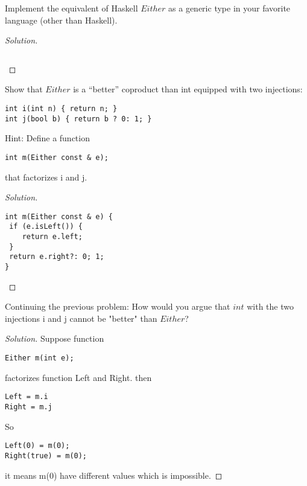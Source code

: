 \documentclass[7x10,thmnumcontwithchapter,WebLink,AddlevelTwoTOC,NumRef,BookEndNote,printer]{pupbook}
\begin{document}
\begin{exercise}
Implement the equivalent of Haskell $Either$ as a generic type in your favorite language (other than Haskell).
\end{exercise}

\begin{proof}[Solution]
~\\
\begin{lstlisting}

\end{lstlisting}
\end{proof}


\begin{exercise}
	Show that $Either$ is a “better” coproduct than int equipped with two injections:
\begin{lstlisting}
int i(int n) { return n; }
int j(bool b) { return b ? 0: 1; }
\end{lstlisting}
Hint: Define a function
\begin{lstlisting}
int m(Either const & e);
\end{lstlisting}
that factorizes i and j.
\end{exercise}

\begin{proof}[Solution]
~\\	
\begin{lstlisting}
int m(Either const & e) {
 if (e.isLeft()) {
    return e.left;
 }
 return e.right?: 0; 1;
}
\end{lstlisting}
\end{proof}


\begin{exercise}
Continuing the previous problem: How would you argue that $int$ with the two injections i and j cannot be "better" than $Either$?
\end{exercise}

\begin{proof}[Solution]	
Suppose function
\begin{lstlisting}
Either m(int e);
\end{lstlisting}
factorizes function Left and Right. then
\begin{lstlisting}
Left = m.i
Right = m.j
\end{lstlisting}
So
\begin{lstlisting}
Left(0) = m(0);
Right(true) = m(0);
\end{lstlisting}
it means m(0) have different values which is impossible.
\end{proof}
\end{document}
